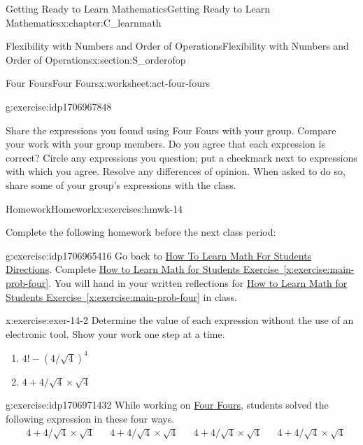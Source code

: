 \documentclass[oneside,10pt,]{book}
\newcommand{\xreffont}{\relax}
\numberwithin{equation}{chapter}
\newcommand{\amp}{&}
\begin{document}
\begin{chapterptx}{Getting Ready to Learn Mathematics}{}{Getting Ready to Learn Mathematics}{}{}{x:chapter:C_learnmath}
\begin{sectionptx}{Flexibility with Numbers and Order of Operations}{}{Flexibility with Numbers and Order of Operations}{}{}{x:section:S_orderofop}
\begin{worksheet-subsection}{Four Fours}{}{Four Fours}{}{}{x:worksheet:act-four-fours}
\begin{divisionexercise}{4}{}{}{g:exercise:idp1706967848}
\end{divisionexercise}%
\begin{conclusion}{}%
Share the expressions you found using Four Fours with your group. Compare your work with your group members. Do you agree that each expression is correct? Circle any expressions you question; put a checkmark next to expressions with which you agree. Resolve any differences of opinion. When asked to do so, share some of your group's expressions with the class.%
\end{conclusion}%
\end{worksheet-subsection}
\restoregeometry
%
%
\typeout{************************************************}
\typeout{************************************************}
%
\begin{exercises-subsection}{Homework}{}{Homework}{}{}{x:exercises:hmwk-14}
\begin{introduction}{}%
Complete the following homework before the next class period:%
\end{introduction}%
\begin{divisionexercise}{1}{}{}{g:exercise:idp1706965416}%
Go back to \hyperlink{x:paragraphs:htlmfs-directions}{How To Learn Math For Students Directions}. Complete \hyperref[x:exercise:main-prob-four]{How to Learn Math for Students Exercise~{\xreffont\ref{x:exercise:main-prob-four}}}. You will hand in your written reflections for \hyperref[x:exercise:main-prob-four]{How to Learn Math for Students Exercise~{\xreffont\ref{x:exercise:main-prob-four}}} in class.%
\end{divisionexercise}%
\begin{divisionexercise}{2}{}{}{x:exercise:exer-14-2}%
Determine the value of each expression without the use of an electronic tool. Show your work one step at a time.%
\begin{enumerate}[font=\bfseries,label=(\alph*),ref=\alph*]
\item\label{x:task:exer-14-2a}\(4! - \left(4/ \sqrt{4} \right)^{4}\)%
\item{}\(4 + 4 / \sqrt{4} \times \sqrt{4}\)%
\end{enumerate}
\end{divisionexercise}%
\begin{divisionexercise}{3}{}{}{g:exercise:idp1706971432}%
While working on \hyperref[x:worksheet:act-four-fours]{Four Fours}, students solved the following expression in these four ways.%
\begin{align*}
\amp 4 + 4 / \sqrt{4} \times \sqrt{4} \amp \amp 4 + 4 / \sqrt{4} \times \sqrt{4} \amp \amp 4 + 4 / \sqrt{4} \times \sqrt{4} \amp \amp 4 + 4 / \sqrt{4} \times \sqrt{4}\\

\end{align*}
\end{divisionexercise}
\end{exercises-subsection}
\end{sectionptx}
\end{chapterptx}
\end{document}
